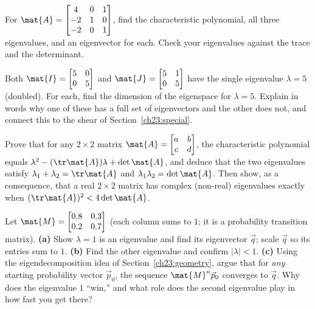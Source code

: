 \begin{exercise}
\label{ch23:ex-3full}
For $\mat{A}=\begin{bmatrix}4 & 0 & 1\\ -2 & 1 & 0\\ -2 & 0 & 1\end{bmatrix}$,
find the characteristic polynomial, all three eigenvalues, and an eigenvector for
each. Check your eigenvalues against the trace and the determinant.
\end{exercise}

\begin{exercise}
\label{ch23:ex-repeat}
Both $\mat{I}=\begin{bmatrix}5 & 0\\ 0 & 5\end{bmatrix}$ and
$\mat{J}=\begin{bmatrix}5 & 1\\ 0 & 5\end{bmatrix}$ have the single eigenvalue
$\lambda=5$ (doubled). For each, find the dimension of the eigenspace for
$\lambda=5$. Explain in words why one of these has a full set of eigenvectors and
the other does not, and connect this to the shear of Section~\ref{ch23:special}.
\end{exercise}

\begin{exercise}
\label{ch23:ex-proof}
Prove that for any $2\times 2$ matrix $\mat{A}=\begin{bmatrix}a&b\\c&d\end{bmatrix}$,
the characteristic polynomial equals $\lambda^2-(\tr\mat{A})\lambda+\det\mat{A}$,
and deduce that the two eigenvalues satisfy $\lambda_1+\lambda_2=\tr\mat{A}$ and
$\lambda_1\lambda_2=\det\mat{A}$. Then show, as a consequence, that a real
$2\times 2$ matrix has complex (non-real) eigenvalues exactly when
$(\tr\mat{A})^2<4\det\mat{A}$.
\end{exercise}

\begin{exercise}
\label{ch23:ex-markov}
Let $\mat{M}=\begin{bmatrix}0.8 & 0.3\\ 0.2 & 0.7\end{bmatrix}$ (each column sums
to $1$; it is a probability transition matrix). \textbf{(a)} Show $\lambda=1$ is an
eigenvalue and find its eigenvector $\vec{q}$; scale $\vec{q}$ so its entries sum to
$1$. \textbf{(b)} Find the other eigenvalue and confirm $|\lambda|<1$.
\textbf{(c)} Using the eigendecomposition idea of
Section~\ref{ch23:geometry}, argue that for \emph{any} starting probability vector
$\vec{p}_0$, the sequence $\mat{M}^n\vec{p}_0$ converges to $\vec{q}$. Why does the
eigenvalue $1$ ``win,'' and what role does the second eigenvalue play in how fast
you get there?
\end{exercise}

